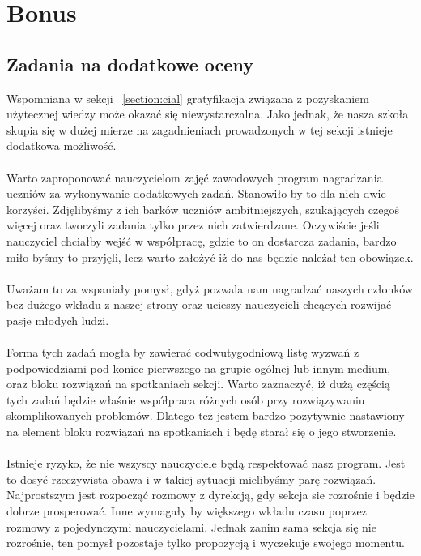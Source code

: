 \documentclass[9pt,a4paper]{report}
\begin{document}
\chapter{Bonus} 

\section{Zadania na dodatkowe oceny} 

Wspomniana w sekcji ~\ref{section:cial} gratyfikacja związana z pozyskaniem użytecznej wiedzy może okazać się niewystarczalna. Jako jednak, że nasza szkoła skupia się w dużej mierze na zagadnieniach prowadzonych w tej sekcji istnieje dodatkowa możliwość.\\\\ 

Warto zaproponować nauczycielom zajęć zawodowych program nagradzania uczniów za wykonywanie dodatkowych zadań. Stanowiło by to dla nich dwie korzyści. Zdjęlibyśmy z ich barków uczniów ambitniejszych, szukających czegoś więcej oraz tworzyli zadania tylko przez nich zatwierdzane. Oczywiście jeśli nauczyciel chciałby wejść w współpracę, gdzie to on dostarcza zadania, bardzo miło byśmy to przyjęli, lecz warto założyć iż do nas będzie należał ten obowiązek.\\\\ 

Uważam to za wspaniały pomysł, gdyż pozwala nam nagradzać naszych członków bez dużego wkładu z naszej strony oraz ucieszy nauczycieli chcących rozwijać pasje młodych ludzi.\\\\ 

Forma tych zadań mogła by zawierać codwutygodniową listę wyzwań z podpowiedziami pod koniec pierwszego na grupie ogólnej lub innym medium, oraz bloku rozwiązań na spotkaniach sekcji. Warto zaznaczyć, iż dużą częścią tych zadań będzie właśnie współpraca różnych osób przy rozwiązywaniu skomplikowanych problemów. Dlatego też jestem bardzo pozytywnie nastawiony na element bloku rozwiązań na spotkaniach i będę starał się o jego stworzenie.\\\\ 

Istnieje ryzyko, że nie wszyscy nauczyciele będą respektować nasz program. Jest to dosyć rzeczywista obawa i w takiej sytuacji mielibyśmy parę rozwiązań. Najprostszym jest rozpocząć rozmowy z dyrekcją, gdy sekcja sie rozrośnie i będzie dobrze prosperować. Inne wymagały by większego wkładu czasu poprzez rozmowy z pojedynczymi nauczycielami. Jednak zanim sama sekcja się nie rozrośnie, ten pomysł pozostaje tylko propozycją i wyczekuje swojego momentu. 
\end{document}
